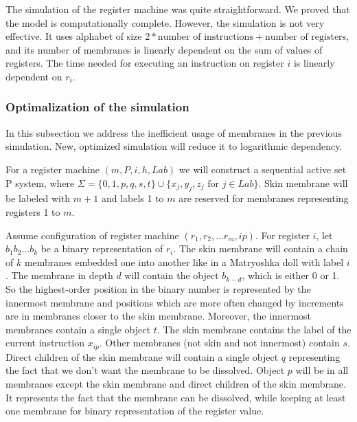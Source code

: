     The simulation of the register machine was quite straightforward. We proved that the model is computationally complete. However, the simulation is not very effective. It uses alphabet of size $2 * \text{number of instructions} + \text{number of registers}$, and its number of membranes is linearly dependent on the sum of values of registers. The time needed for executing an instruction on register $i$ is linearly dependent on $r_i$.


  \subsubsection{Optimalization of the simulation} %
  \label{ssub:optimalization_of_the_simulation}
    In this subsection we address the inefficient usage of membranes in the previous simulation. New, optimized simulation will reduce it to logarithmic dependency.

    For a register machine $(m,P,i,h,Lab)$ we will construct a sequential active set P system, where $\Sigma = \{0,1,p,q,s,t\}\cup\{x_j, y_j, z_j \text{~for~} j\in Lab\}$. Skin membrane will be labeled with $m+1$ and labels 1 to $m$ are reserved for membranes representing registers 1 to $m$.

    Assume configuration of register machine $(r_1, r_2, \ldots r_m, ip)$. For register $i$, let $b_1b_2\ldots b_k$ be a binary representation of $r_i$. The skin membrane will contain a chain of $k$ membranes embedded one into another like in a Matryoshka doll with label $i$.
    The membrane in depth $d$ will contain the object $b_{k-d}$, which is either 0 or 1. So the highest-order position in the binary number is represented by the innermost membrane and positions which are more often changed by increments are in membranes closer to the skin membrane. Moreover, the innermost membranes contain a single object $t$. The skin membrane contains the label of the current instruction $x_{ip}$. Other membranes (not skin and not innermost) contain $s$. Direct children of the skin membrane will contain a single object $q$ representing the fact that we don't want the membrane to be dissolved. Object $p$ will be in all membranes except the skin membrane and direct children of the skin membrane. It represents the fact that the membrane can be dissolved, while keeping at least one membrane for binary representation of the register value.

